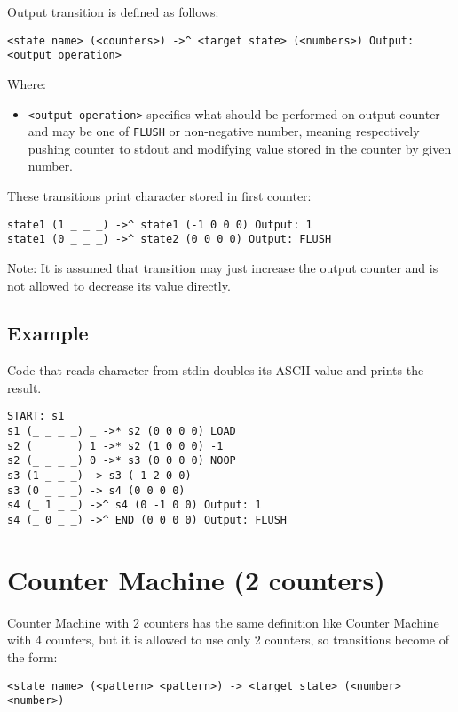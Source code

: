 \documentclass[english,shortabstract,mgr]{iithesis}
\begin{document}
Output transition is defined as follows:
\begin{verbatim}
<state name> (<counters>) ->^ <target state> (<numbers>) Output: <output operation>
\end{verbatim}

Where:
\begin{itemize}
  \item \texttt{<output operation>} specifies what should be performed
      on output counter and may be one of \texttt{FLUSH} or non-negative number,
      meaning respectively pushing counter to stdout and modifying
      value stored in the counter by given number.
\end{itemize}

These transitions print character stored in first counter:
\begin{verbatim}
state1 (1 _ _ _) ->^ state1 (-1 0 0 0) Output: 1
state1 (0 _ _ _) ->^ state2 (0 0 0 0) Output: FLUSH
\end{verbatim}

Note: It is assumed that transition may just increase the output counter
and is not allowed to decrease its value directly.


\subsection{Example}

Code that reads character from stdin doubles its ASCII value and prints the result.
\begin{verbatim}
START: s1
s1 (_ _ _ _) _ ->* s2 (0 0 0 0) LOAD
s2 (_ _ _ _) 1 ->* s2 (1 0 0 0) -1
s2 (_ _ _ _) 0 ->* s3 (0 0 0 0) NOOP
s3 (1 _ _ _) -> s3 (-1 2 0 0)
s3 (0 _ _ _) -> s4 (0 0 0 0)
s4 (_ 1 _ _) ->^ s4 (0 -1 0 0) Output: 1
s4 (_ 0 _ _) ->^ END (0 0 0 0) Output: FLUSH
\end{verbatim}

\section {Counter Machine (2 counters)}

Counter Machine with 2 counters has the same definition like
Counter Machine with 4 counters, but it is allowed to use only
2 counters, so transitions become of the form:

\begin{verbatim}
<state name> (<pattern> <pattern>) -> <target state> (<number> <number>)
\end{verbatim}
\end{document}
